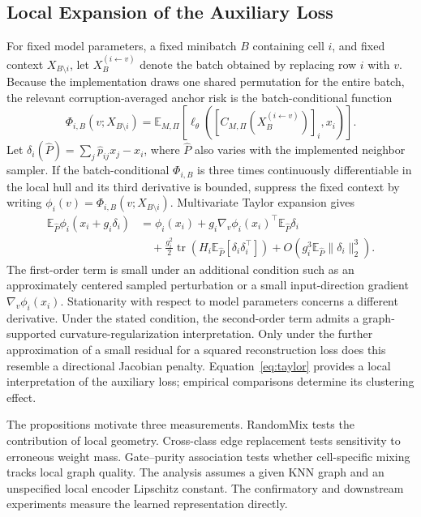 \subsection{Local Expansion of the Auxiliary Loss}

For fixed model parameters, a fixed minibatch $B$ containing cell $i$, and
fixed context $X_{B\setminus i}$, let $X_B^{(i\leftarrow v)}$ denote the batch
obtained by replacing row $i$ with $v$.  Because the implementation draws one
shared permutation for the entire batch, the relevant corruption-averaged
anchor risk is the batch-conditional function
\begin{equation}
 \Phi_{i,B}(v;X_{B\setminus i})=\mathbb E_{M,\Pi}
 \!\left[\ell_\theta\!\left(
 [C_{M,\Pi}(X_B^{(i\leftarrow v)})]_i,x_i\right)\right].
\end{equation}
Let $\delta_i(\widehat P)=\sum_j\widehat p_{ij}x_j-x_i$, where $\widehat P$
also varies with the implemented neighbor sampler.  If the batch-conditional
$\Phi_{i,B}$ is three times continuously differentiable in the local hull and
its third derivative is bounded, suppress the fixed context by writing
$\phi_i(v)=\Phi_{i,B}(v;X_{B\setminus i})$.  Multivariate Taylor expansion gives
\begin{align}
 \mathbb E_{\widehat P}\phi_i(x_i+g_i\delta_i)
 &=\phi_i(x_i)
 +g_i\nabla_v\phi_i(x_i)^\top
   \mathbb E_{\widehat P}\delta_i \nonumber\\
 &\quad+\frac{g_i^2}{2}\operatorname{tr}
 \left(H_i\mathbb E_{\widehat P}[\delta_i\delta_i^\top]\right)
 +O\!\left(g_i^3\mathbb E_{\widehat P}\|\delta_i\|_2^3\right).
 \label{eq:taylor}
\end{align}
The first-order term is small under an additional condition such as an
approximately centered sampled perturbation or a small input-direction
gradient $\nabla_v\phi_i(x_i)$. Stationarity with respect to model parameters
concerns a different derivative. Under the stated condition, the
second-order term admits a graph-supported curvature-regularization
interpretation.  Only under the further approximation of a small residual for a squared
reconstruction loss does this resemble a directional Jacobian penalty.
Equation~\eqref{eq:taylor} provides a local interpretation of the auxiliary
loss; empirical comparisons determine its clustering effect.

The propositions motivate three measurements. RandomMix tests the contribution
of local geometry. Cross-class edge replacement tests sensitivity to erroneous
weight mass. Gate--purity association tests whether cell-specific mixing tracks
local graph quality. The analysis assumes a given KNN graph and an unspecified
local encoder Lipschitz constant. The confirmatory and downstream experiments
measure the learned representation directly.
